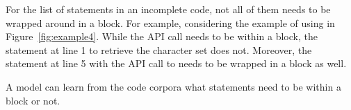 For the list of statements in an incomplete code, not all of them
needs to be wrapped around in a  block. For example,
considering the example of using  in
Figure~\ref{fig:example4}. While the API call
 needs to be within a
 block, the statement at line 1 to retrieve the
character set does not. Moreover, the statement at line 5 with the API
call to  needs to be wrapped in a 
block as well.



\begin{Observation} 
\label{ob5}
  A model can learn from the code corpora what statements need to be
  within a  block or not.
\end{Observation}
